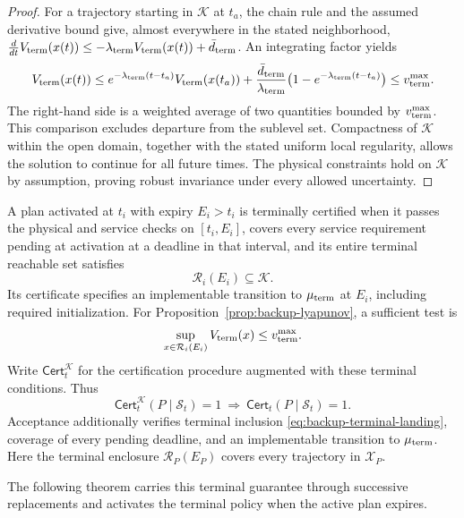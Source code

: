 \documentclass[preprint,12pt]{elsarticle}
\theoremstyle{definition}
\theoremstyle{plain}
\theoremstyle{definition}
\theoremstyle{plain}
\begin{document}
\begin{proof}
For a trajectory starting in $\mathcal K$ at $t_a$, the chain rule
and the assumed derivative bound give, almost everywhere in the stated
neighborhood,
$\frac{d}{dt}V_{\rm term}(x(t))\le-\lambda_{\rm term} V_{\rm term}(x(t))+\bar d_{\rm term}$.
An integrating factor yields
\[
 V_{\rm term}(x(t))\le e^{-\lambda_{\rm term}(t-t_a)}V_{\rm term}(x(t_a))+
 \frac{\bar d_{\rm term}}{\lambda_{\rm term}}\bigl(1-e^{-\lambda_{\rm term}(t-t_a)}\bigr)
 \le v_{\rm term}^{\max}.
\]
The right-hand side is a weighted average of two quantities bounded by
$v_{\rm term}^{\max}$. This comparison excludes departure from the sublevel set.
Compactness of $\mathcal K$ within the open domain, together with the
stated uniform local regularity, allows the solution to continue for
all future times. The physical constraints hold on $\mathcal K$ by
assumption, proving robust invariance under every allowed uncertainty.
\end{proof}

A plan activated at $t_i$ with expiry $E_i>t_i$ is terminally certified
when it passes the physical and service checks on $[t_i,E_i]$, covers
every service requirement pending at activation at a deadline in that interval,
and its entire terminal reachable set satisfies
\begin{equation}
\mathcal R_i(E_i)\subseteq\mathcal K.
\label{eq:backup-terminal-landing}
\end{equation}
Its certificate specifies an implementable transition to $\mu_{\rm term}$ at
$E_i$, including required initialization. For
Proposition~\ref{prop:backup-lyapunov}, a sufficient test is
\begin{equation}
\sup_{x\in\mathcal R_i(E_i)}V_{\rm term}(x)\le v_{\rm term}^{\max}.
\label{eq:backup-computable-landing}
\end{equation}
Write $\mathsf{Cert}^{\mathcal K}_t$ for the certification procedure augmented with
these terminal conditions. Thus
\begin{equation}
\mathsf{Cert}^{\mathcal K}_t(P\mid\mathcal S_t)=1
\ \Longrightarrow\ \mathsf{Cert}_t(P\mid\mathcal S_t)=1.
\label{eq:terminal-checker}
\end{equation}
Acceptance additionally verifies terminal inclusion
\eqref{eq:backup-terminal-landing}, coverage of every pending deadline,
and an implementable transition to $\mu_{\rm term}$. Here the terminal enclosure
$\mathcal R_P(E_P)$ covers every trajectory in $\mathcal X_P$.

The following theorem carries this terminal guarantee through successive
replacements and activates the terminal policy when the active plan expires.
\end{document}
